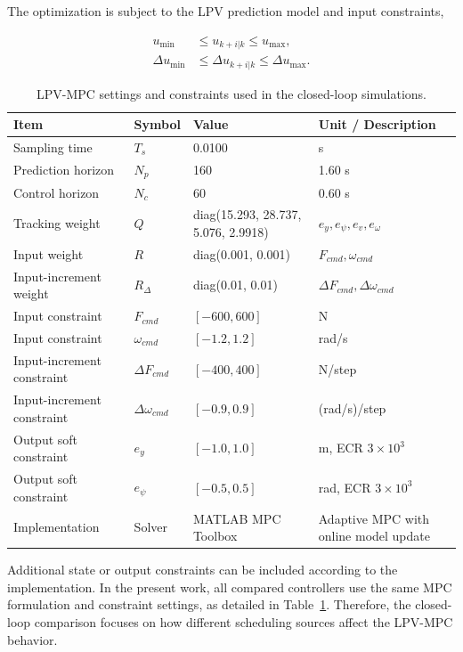 \documentclass{ieeeaccess}
\begin{document}
The optimization is subject to the LPV prediction model and input constraints,

\begin{align}
u_{\min} &\leq u_{k+i|k} \leq u_{\max}, \label{eq:input_constraint}\\
\Delta u_{\min} &\leq \Delta u_{k+i|k} \leq \Delta u_{\max}.
\label{eq:input_rate_constraint}
\end{align}

\begin{table}[!t]
\centering
\caption{LPV-MPC settings and constraints used in the closed-loop simulations.}
\label{tab:mpc_settings}
\footnotesize
\begin{tabular}{llll}
\hline
Item & Symbol & Value & Unit / Description \\
\hline
Sampling time & $T_s$ & 0.0100 & s \\
Prediction horizon & $N_p$ & 160 & 1.60 s \\
Control horizon & $N_c$ & 60 & 0.60 s \\
Tracking weight & $Q$ & diag(15.293, 28.737, 5.076, 2.9918) & $e_y,e_\psi,e_v,e_\omega$ \\
Input weight & $R$ & diag(0.001, 0.001) & $F_{cmd},\omega_{cmd}$ \\
Input-increment weight & $R_{\Delta}$ & diag(0.01, 0.01) & $\Delta F_{cmd},\Delta \omega_{cmd}$ \\
Input constraint & $F_{cmd}$ & $[-600,600]$ & N \\
Input constraint & $\omega_{cmd}$ & $[-1.2,1.2]$ & rad/s \\
Input-increment constraint & $\Delta F_{cmd}$ & $[-400,400]$ & N/step \\
Input-increment constraint & $\Delta\omega_{cmd}$ & $[-0.9,0.9]$ & (rad/s)/step \\
Output soft constraint & $e_y$ & $[-1.0,1.0]$ & m, ECR $3\times10^3$ \\
Output soft constraint & $e_\psi$ & $[-0.5,0.5]$ & rad, ECR $3\times10^3$ \\
Implementation & Solver & MATLAB MPC Toolbox & Adaptive MPC with online model update \\
\hline
\end{tabular}
\end{table}
\FloatBarrier

Additional state or output constraints can be included according to the implementation. In the present work, all compared controllers use the same MPC formulation and constraint settings, as detailed in Table~\ref{tab:mpc_settings}. Therefore, the closed-loop comparison focuses on how different scheduling sources affect the LPV-MPC behavior.
\FloatBarrier
\end{document}
